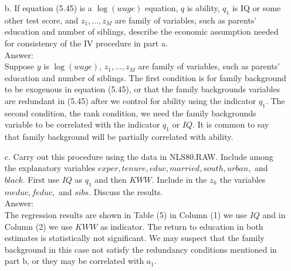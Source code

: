 \documentclass[10pt]{article}
\begin{document}
\begin{enumerate}
\item[b.] If equation (5.45) is a $\log(wage)$ equation, $q$ is ability, $q_1$ is IQ or some other test score, and $z_1,\ldots,z_M$ are family of variables, such as parents' education and number of siblings, describe the economic assumption needed for consistency of the IV procedure in part a.
\\ Answer:\\
Suppose $y$ is $\log(wage)$, $z_1,\ldots,z_M$ are family of variables, such as parents' education and number of siblings. The first condition is for family background to be exogenous in equation (5.45), or that the family backgrounds variables are redundant in (5.45) after we control for ability using the indicator $q_1$. The second condition, the rank condition, we need the family backgrounds variable to be correlated with the indicator $q_1$ or $IQ$. It is common to say that family background will be partially correlated with ability.

\item[c.] Carry out this procedure using the data in NLS80.RAW. Include among the explanatory variables $exper, tenure,educ,married,south,urban,$ and $black$. First use $IQ$ as $q_1$ and then $KWW$. Include in the $z_h$ the variables $meduc,feduc,$ and $sibs.$ Discuss the results.
\\ Answer:\\


The regression results are shown in Table (5) in Column (1) we use $IQ$ and in Column (2) we use $KWW$ as indicator. The return to education in both estimates is statistically not significant. We may suspect that the family background in this case not satisfy the redundancy conditions mentioned in part b, or they may be correlated with $a_1$.
\end{enumerate}
\end{document}
